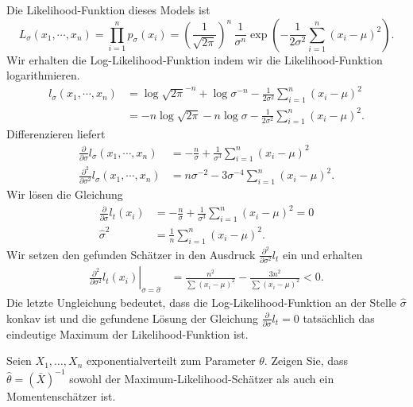 \solution Die Likelihood-Funktion dieses Models ist 
\begin{equation*}
    L_{\sigma}(x_1, \cdots, x_n) = \prod_{i=1}^{n} p_{\sigma}(x_i) = 
    \left( \frac{1}{\sqrt{2\pi}} \right)^n \, \frac{1}{\sigma^n} 
    \exp \left( - \frac{1}{2 \sigma^2} \sum_{i=1}^{n} \left( x_i - \mu \right)^2 \right).
\end{equation*}
Wir erhalten die Log-Likelihood-Funktion indem wir die Likelihood-Funktion 
logarithmieren. 
\begin{align*}
    l_\sigma (x_1, \cdots, x_n) &= \log \sqrt{2\pi}^{-n} + \log \sigma^{-n} 
    - \frac{1}{2 \sigma^2} \sum_{i=1}^{n} \left( x_i - \mu \right)^2   \\
    &= - n\log \sqrt{2 \pi} -n \log \sigma 
    - \frac{1}{2\sigma^2} \sum_{i=1}^{n} \left( x_i - \mu \right)^2.
\end{align*}
Differenzieren liefert
\begin{align*}
    \frac{\partial}{\partial \sigma} l_\sigma(x_1, \cdots, x_n) &= 
    - \frac{n}{\sigma} + \frac{1}{\sigma^3} \sum_{i=1}^{n} \left( x_i - \mu \right)^2 \\
    \frac{\partial^2}{\partial \sigma^2} l_\sigma(x_1, \cdots, x_n) &= 
    n \sigma^{-2} - 3 \sigma^{-4} \sum_{i=1}^{n} \left( x_i - \mu \right)^2. 
\end{align*}
Wir lösen die Gleichung
\begin{align*}
    \frac{\partial}{\partial \sigma} l_t (x_i ) &= 
    - \frac{n}{\sigma} + \frac{1}{\sigma^3} \sum_{i=1}^{n} \left( x_i - \mu \right)^2  = 0 \\
    \hat \sigma^2 &= \frac{1}{n} \sum_{i=1}^{n} \left( x_i - \mu \right)^2. 
\end{align*}
Wir setzen den gefunden Schätzer in den Ausdruck $\frac{\partial^2}{\partial \sigma^2} l_t$
ein und erhalten
\begin{align*}
    \left. \frac{\partial^2}{\partial \sigma^2} l_t(x_i) \right|_{\sigma=\hat\sigma} 
    &= \frac{n^2}{ \sum_{}^{} (x_i-\mu)^2} - \frac{3 n^2}{\sum_{}^{} (x_i -\mu)^2} < 0.
\end{align*}
Die letzte Ungleichung bedeutet, dass die Log-Likelihood-Funktion an der Stelle
$\hat\sigma$ konkav ist und die gefundene Lösung der Gleichung
$\frac{\partial}{\partial \sigma}l_t = 0$ tatsächlich das eindeutige Maximum
der Likelihood-Funktion ist.




 Seien $X_1,\ldots,X_n$
exponentialverteilt zum Parameter $\theta$. Zeigen Sie, dass $\hat \theta =
(\bar X)^{-1}$ sowohl der Maximum-Likelihood-Schätzer als auch ein
Momentenschätzer ist.


